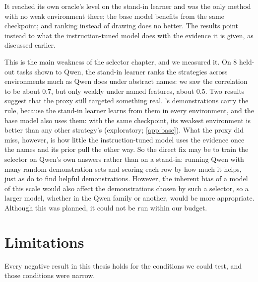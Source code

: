 It reached its own oracle's level on the stand-in learner and was the only method with no weak environment there; the base model benefits from the same checkpoint; and ranking instead of drawing does no better. The results point instead to what the instruction-tuned model does with the evidence it is given, as discussed earlier.


This is the main weakness of the selector chapter, and we measured it. On 8 held-out tasks shown to Qwen, the stand-in learner ranks the strategies across environments much as Qwen does under abstract names: we saw the correlation to be about 0.7, but only weakly under named features, about 0.5. Two results suggest that the proxy still targeted something real. \sata's demonstrations carry the rule, because the stand-in learner learns from them in every environment, and the base model also uses them: with the same checkpoint, its weakest environment is better than any other strategy's (exploratory; \autoref{app:base}). What the proxy did miss, however, is how little the instruction-tuned model uses the evidence once the names and its prior pull the other way. So the direct fix may be to train the selector on Qwen's own answers rather than on a stand-in: running Qwen with many random demonstration sets and scoring each row by how much it helps, just as \citet{chang2023data} do to find helpful demonstrations. However, the inherent bias of a model of this scale would also affect the demonstrations chosen by such a selector, so a larger model, whether in the Qwen family or another, would be more appropriate. Although this was planned, it could not be run within our budget.


\newpage
\section{Limitations}
\label{sec:limitations}

Every negative result in this thesis holds for the conditions we could test, and those conditions were narrow.

